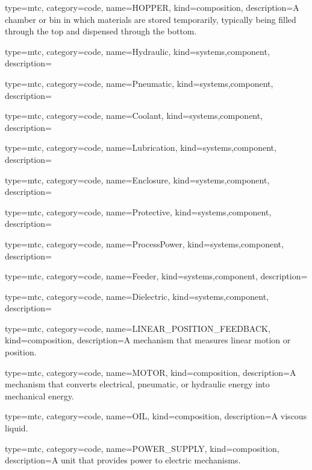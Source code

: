 {
  type=mtc,
  category=code,
  name={HOPPER},
  kind={composition},
  description={A chamber or bin in which materials are stored temporarily, typically being filled through the top and dispensed through the bottom.}
}


{
  type=mtc,
  category=code,
  name={Hydraulic},
  kind={systems,component},
  description={}
}


{
  type=mtc,
  category=code,
  name={Pneumatic},
  kind={systems,component},
  description={}
}


{
  type=mtc,
  category=code,
  name={Coolant},
  kind={systems,component},
  description={}
}


{
  type=mtc,
  category=code,
  name={Lubrication},
  kind={systems,component},
  description={}
}


{
  type=mtc,
  category=code,
  name={Enclosure},
  kind={systems,component},
  description={}
}


{
  type=mtc,
  category=code,
  name={Protective},
  kind={systems,component},
  description={}
}


{
  type=mtc,
  category=code,
  name={ProcessPower},
  kind={systems,component},
  description={}
}


{
  type=mtc,
  category=code,
  name={Feeder},
  kind={systems,component},
  description={}
}


{
  type=mtc,
  category=code,
  name={Dielectric},
  kind={systems,component},
  description={}
}


{
  type=mtc,
  category=code,
  name={LINEAR\_POSITION\_FEEDBACK},
  kind={composition},
  description={A mechanism that measures linear motion or position.}
}


{
  type=mtc,
  category=code,
  name={MOTOR},
  kind={composition},
  description={A mechanism that converts electrical, pneumatic, or hydraulic energy into mechanical energy.}
}


{
  type=mtc,
  category=code,
  name={OIL},
  kind={composition},
  description={A viscous liquid.}
}


{
  type=mtc,
  category=code,
  name={POWER\_SUPPLY},
  kind={composition},
  description={A unit that provides power to electric mechanisms.}
}


